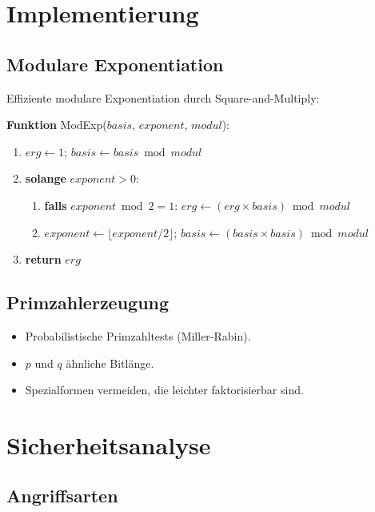 \section{Implementierung}

\subsection{Modulare Exponentiation}

Effiziente modulare Exponentiation durch Square-and-Multiply:

\begin{tcolorbox}[colback=blue!5!white,colframe=blue!75!black,
  title=Algorithmus: Modulare Exponentiation]
\textbf{Funktion} ModExp($basis$, $exponent$, $modul$):
\begin{enumerate}
  \item $erg \gets 1$; $basis \gets basis \bmod modul$
  \item \textbf{solange} $exponent > 0$:
  \begin{enumerate}
    \item \textbf{falls} $exponent \bmod 2 = 1$:
      $erg \gets (erg \times basis) \bmod modul$
    \item $exponent \gets \lfloor exponent/2 \rfloor$;
      $basis \gets (basis \times basis) \bmod modul$
  \end{enumerate}
  \item \textbf{return} $erg$
\end{enumerate}
\end{tcolorbox}

\subsection{Primzahlerzeugung}

\begin{itemize}
  \item Probabilistische Primzahltests (Miller-Rabin).
  \item $p$ und $q$ ähnliche Bitlänge.
  \item Spezialformen vermeiden, die leichter faktorisierbar sind.
\end{itemize}

\section{Sicherheitsanalyse}

\subsection{Angriffsarten}


